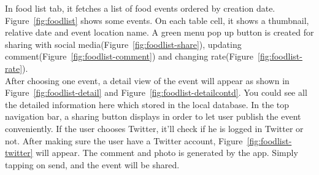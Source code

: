    In food list tab, it fetches a list of food events ordered by creation date. Figure~\ref{fig:foodlist} shows some events. On each table cell, it shows a thumbnail, relative date and event location name. A green menu pop up button is created for sharing with social media(Figure~\ref{fig:foodlist-share}), updating comment(Figure~\ref{fig:foodlist-comment}) and changing rate(Figure~\ref{fig:foodlist-rate}). \\
   
   After choosing one event, a detail view of the event will appear as shown in Figure~\ref{fig:foodlist-detail} and Figure~\ref{fig:foodlist-detailcontd}. You could see all the detailed information here which stored in the local database. In the top navigation bar, a sharing button displays in order to let user publish the event conveniently. If the user chooses Twitter, it'll check if he is logged in Twitter or not. After making sure the user have a Twitter account, Figure~\ref{fig:foodlist-twitter} will appear. The comment and photo is generated by the app. Simply tapping on send, and the event will be shared. \\
   

